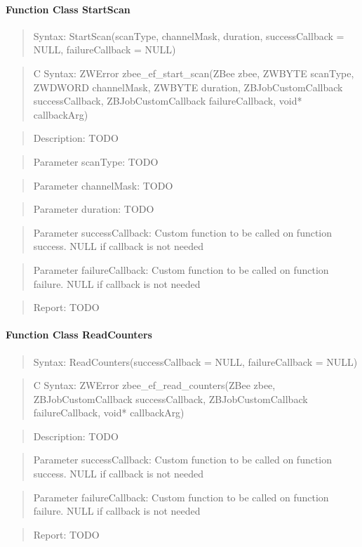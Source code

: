 \paragraph{Function Class StartScan}
\begin{quote}Syntax: StartScan(scanType, channelMask, duration, successCallback = NULL, failureCallback = NULL)\end{quote}
\begin{quote}C Syntax: ZWError zbee\_ef\_start\_scan(ZBee zbee, ZWBYTE scanType, ZWDWORD channelMask, ZWBYTE duration, ZBJobCustomCallback successCallback, ZBJobCustomCallback failureCallback, void* callbackArg)\end{quote}
\begin{quote}Description: TODO\end{quote}
\begin{quote}Parameter scanType: TODO\end{quote}
\begin{quote}Parameter channelMask: TODO\end{quote}
\begin{quote}Parameter duration: TODO\end{quote}
\begin{quote}Parameter successCallback: Custom function to be called on function success. NULL if callback is not needed\end{quote}
\begin{quote}Parameter failureCallback: Custom function to be called on function failure. NULL if callback is not needed\end{quote}
\begin{quote}Report: TODO\end{quote}

\paragraph{Function Class ReadCounters}
\begin{quote}Syntax: ReadCounters(successCallback = NULL, failureCallback = NULL)\end{quote}
\begin{quote}C Syntax: ZWError zbee\_ef\_read\_counters(ZBee zbee, ZBJobCustomCallback successCallback, ZBJobCustomCallback failureCallback, void* callbackArg)\end{quote}
\begin{quote}Description: TODO\end{quote}
\begin{quote}Parameter successCallback: Custom function to be called on function success. NULL if callback is not needed\end{quote}
\begin{quote}Parameter failureCallback: Custom function to be called on function failure. NULL if callback is not needed\end{quote}
\begin{quote}Report: TODO\end{quote}

